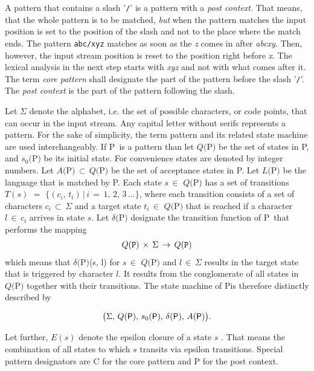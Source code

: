 \documentclass[acmtoplas]{acmtrans2m}
\newcommand{\fq}[1]{$Q(${\sf #1}$)$}
\newcommand{\fdelta}[1]{$\delta(${\sf #1}$)$}
\newcommand{\pP}{{\sf P}}
\begin{document}
A pattern that contains a slash '\verb|/|' is a pattern with a {\it post
    context}.  That means, that the whole pattern is to be matched,
{\it but} when the pattern matches the input position is set to the
position of the slash and not to the place where the match ends. The
pattern {\tt abc/xyz} matches as soon as the {\it z} comes in after {\it
abcxy}. Then, however, the input stream position is reset to the position
right before {\it x}. The lexical analysis in the next step starts with {\it
xyz} and not with what comes after it. The term {\it core pattern} shall
designate the part of the pattern before the slash '\verb|/|'. The {\it
post context} is the part of the pattern following the slash.

Let $\Sigma$ denote the alphabet, i.e. the set of possible characters, or code points, that can
occur in the input stream.  Any capital letter without serifs represents a
pattern. For the sake of simplicity, the term pattern and its related state
machine are used interchangeably. If \pP\ is a pattern than let 
$Q($\pP$)$ be the set of states in \pP, and $s_0($\pP$)$ be its initial state. For
convenience states are denoted by integer numbers. Let $A($\pP$)\,\subset\,Q($\pP$)$ 
be the set of acceptance states in \pP.  Let $L($\pP$)$ be the language that 
is matched by \pP.  Each state $s\,\in$ \fq{P} has a set of 
transitions $T(s)$ $=$ $\{(c_i,\,t_i) \,|\, i\,=\,1,\,2,\,3\,\ldots\}$, where each
transition consists of a set of characters $c_i\,\subset\,\Sigma$ and a target
state $t_i\,\in$ \fq{P} that is reached if a character $l\,\in\,c_i$ 
arrives in state $s$.  Let \fdelta{P} designate the transition function of \pP\ 
that performs the mapping
\begin{eqnarray}
Q(\mbox{\tt P})\,\times\,\Sigma\,\rightarrow\,Q(\mbox{\tt P})
\end{eqnarray}
which means that \fdelta{P}(s, l) for $s\,\in$ \fq{P} and $l\,\in\,\Sigma$
results in the target state that is triggered by character $l$.  It results from the conglomerate of 
all states in \fq{P} together with their transitions. The state machine of
\pP is therefore distinctly described by

\begin{eqnarray}
\big(\Sigma,\,
Q(\mbox{\sf P}),\,
s_0(\mbox{\sf P}),\,
\delta(\mbox{\sf P}),\,
A(\mbox{\sf P}) \big).
\end{eqnarray}

Let further, $E(s)$ denote the epsilon closure of a state $s$
\cite{Rabin:1959}.  That means the combination of all states to which $s$
transits via epsilon transitions. Special pattern designators are {\sf C} for
the core pattern and {\sf P} for the post context.
\end{document}
